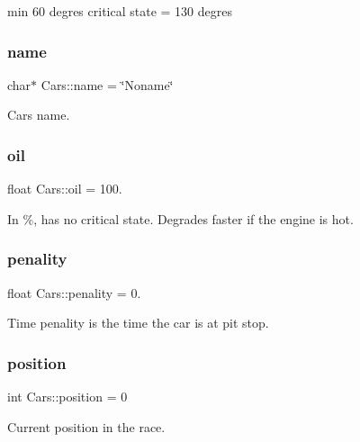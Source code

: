 min 60 degres critical state = 130 degres 

\mbox{\label{class_cars_a111cd976930fe6e8771e2d66656dc6b1}} 
\subsubsection{\texorpdfstring{name}{name}}
{\footnotesize\ttfamily char$\ast$ Cars\+::name = \char`\"{}Noname\char`\"{}}



Car\textquotesingle{}s name. 

\mbox{\label{class_cars_a28cbb5119f146066362167ef0a539e72}} 
\subsubsection{\texorpdfstring{oil}{oil}}
{\footnotesize\ttfamily float Cars\+::oil = 100.}

In \%, has no critical state. Degrades faster if the engine is hot. \mbox{\label{class_cars_a94f7fa28053d92e23aa5ead0b6f46361}} 
\subsubsection{\texorpdfstring{penality}{penality}}
{\footnotesize\ttfamily float Cars\+::penality = 0.}



Time penality is the time the car is at pit stop. 

\mbox{\label{class_cars_aa33805da5fade7a5ed72003db3011445}} 
\subsubsection{\texorpdfstring{position}{position}}
{\footnotesize\ttfamily int Cars\+::position = 0}



Current position in the race. 

\mbox{\label{class_cars_a8fb4198d05e96e32197b7a155db11f6d}} 
